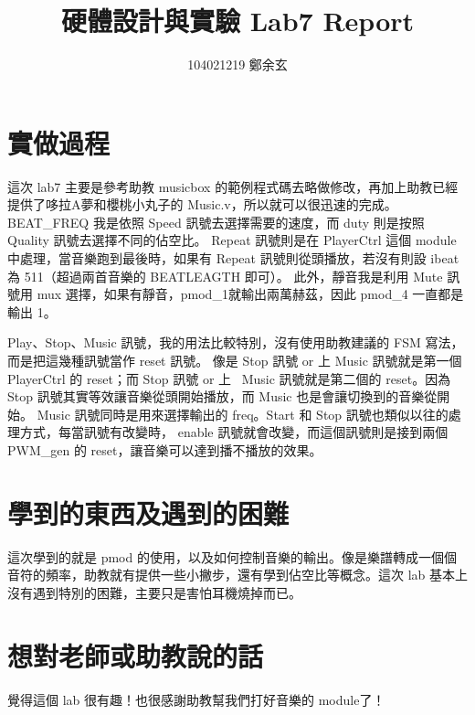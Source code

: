 \documentclass{article}
\begin{document}
\begin{CJK}{UTF8}{bsmi}
\title{硬體設計與實驗 Lab7 Report}
\author{104021219 鄭余玄}
\date{}
\maketitle
\section{實做過程}
這次 lab7 主要是參考助教 musicbox 的範例程式碼去略做修改，再加上助教已經提供了哆拉A夢和櫻桃小丸子的 Music.v，所以就可以很迅速的完成。BEAT\_FREQ 我是依照 Speed 訊號去選擇需要的速度，而 duty 則是按照 Quality 訊號去選擇不同的佔空比。 Repeat 訊號則是在 PlayerCtrl 這個 module 中處理，當音樂跑到最後時，如果有 Repeat 訊號則從頭播放，若沒有則設 ibeat 為 511（超過兩首音樂的 BEATLEAGTH 即可）。 此外，靜音我是利用 Mute 訊號用 mux 選擇，如果有靜音，pmod\_1就輸出兩萬赫茲，因此 pmod\_4 一直都是輸出 1。

Play、Stop、Music 訊號，我的用法比較特別，沒有使用助教建議的 FSM 寫法，而是把這幾種訊號當作 reset 訊號。 像是 Stop 訊號 or 上 Music 訊號就是第一個 PlayerCtrl 的 reset；而 Stop 訊號 or 上 ~Music 訊號就是第二個的 reset。因為 Stop 訊號其實等效讓音樂從頭開始播放，而 Music 也是會讓切換到的音樂從開始。 Music 訊號同時是用來選擇輸出的 freq。Start 和 Stop 訊號也類似以往的處理方式，每當訊號有改變時， enable 訊號就會改變，而這個訊號則是接到兩個 PWM\_gen 的 reset，讓音樂可以達到播不播放的效果。

\section{學到的東西及遇到的困難}
這次學到的就是 pmod 的使用，以及如何控制音樂的輸出。像是樂譜轉成一個個音符的頻率，助教就有提供一些小撇步，還有學到佔空比等概念。這次 lab 基本上沒有遇到特別的困難，主要只是害怕耳機燒掉而已。

\section{想對老師或助教說的話}
覺得這個 lab 很有趣！也很感謝助教幫我們打好音樂的 module了！

\end{CJK}
\end{document}
